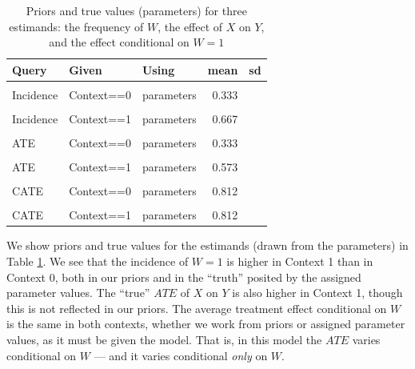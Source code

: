 \documentclass[
  12pt,
]{book}
\begin{document}
\begin{table}

\caption{\label{tab:appev2}Priors and true values (parameters) for three estimands: the frequency of $W$, the effect of $X$ on $Y$, and the effect conditional on $W=1$}
\centering
\begin{tabular}[t]{lllrr}
\toprule
Query & Given & Using & mean & sd\\
\midrule
\cellcolor{gray!6}{Incidence} & \cellcolor{gray!6}{Context==0} & \cellcolor{gray!6}{priors} & \cellcolor{gray!6}{0.332} & \cellcolor{gray!6}{0.231}\\
Incidence & Context==0 & parameters & 0.333 & \\
\cellcolor{gray!6}{Incidence} & \cellcolor{gray!6}{Context==1} & \cellcolor{gray!6}{priors} & \cellcolor{gray!6}{0.666} & \cellcolor{gray!6}{0.234}\\
Incidence & Context==1 & parameters & 0.667 & \\
\cellcolor{gray!6}{ATE} & \cellcolor{gray!6}{Context==0} & \cellcolor{gray!6}{priors} & \cellcolor{gray!6}{0.001} & \cellcolor{gray!6}{0.138}\\
\addlinespace
ATE & Context==0 & parameters & 0.333 & \\
\cellcolor{gray!6}{ATE} & \cellcolor{gray!6}{Context==1} & \cellcolor{gray!6}{priors} & \cellcolor{gray!6}{0.000} & \cellcolor{gray!6}{0.140}\\
ATE & Context==1 & parameters & 0.573 & \\
\cellcolor{gray!6}{CATE} & \cellcolor{gray!6}{Context==0} & \cellcolor{gray!6}{priors} & \cellcolor{gray!6}{0.001} & \cellcolor{gray!6}{0.169}\\
CATE & Context==0 & parameters & 0.812 & \\
\addlinespace
\cellcolor{gray!6}{CATE} & \cellcolor{gray!6}{Context==1} & \cellcolor{gray!6}{priors} & \cellcolor{gray!6}{0.001} & \cellcolor{gray!6}{0.169}\\
CATE & Context==1 & parameters & 0.812 & \\
\bottomrule
\end{tabular}
\end{table}

We show priors and true values for the estimands (drawn from the parameters) in Table \ref{tab:appev2}. We see that the incidence of \(W=1\) is higher in Context 1 than in Context 0, both in our priors and in the ``truth'' posited by the assigned parameter values. The ``true'' \(ATE\) of \(X\) on \(Y\) is also higher in Context 1, though this is not reflected in our priors. The average treatment effect conditional on \(W\) is the same in both contexts, whether we work from priors or assigned parameter values, as it must be given the model. That is, in this model the \(ATE\) varies conditional on \(W\) --- and it varies conditional \emph{only} on \(W\).
\end{document}
